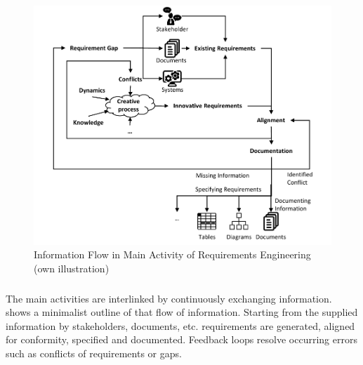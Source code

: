 \begin{figure}[H]
    \centering
    \includegraphics[scale=1]{img/MainActivity.pdf}
    \caption[Information Flow in Main Activity of Requirements Engineering]{Information Flow in Main Activity of Requirements Engineering (own illustration)}
    \label{fig:infFlow}
\end{figure}
\subparagraph{}\label{beginmain} The main activities are interlinked by continuously exchanging information.  shows a minimalist outline of that flow of information. Starting from the supplied information by stakeholders, documents, etc. requirements are generated, aligned for conformity, specified and documented. Feedback loops resolve occurring errors such as conflicts of requirements or gaps.
